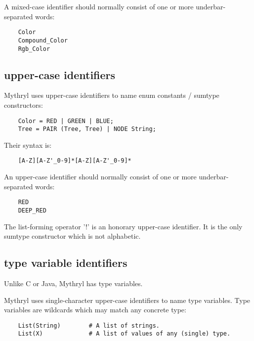 A mixed-case identifier should normally consist of 
one or more underbar-separated words:

\begin{verbatim}
    Color
    Compound_Color
    Rgb_Color
\end{verbatim}

\cutend*

\subsection{upper-case identifiers}
\label{section:ref:identifiers:upper-case}

Mythryl uses upper-case identifiers to name 
enum constants / sumtype constructors:

\begin{verbatim}
    Color = RED | GREEN | BLUE;
    Tree = PAIR (Tree, Tree) | NODE String;
\end{verbatim}

Their syntax is:

\begin{verbatim}
    [A-Z][A-Z'_0-9]*[A-Z][A-Z'_0-9]*
\end{verbatim}

An upper-case identifier should normally consist of 
one or more underbar-separated words:

\begin{verbatim}
    RED
    DEEP_RED
\end{verbatim}

The list-forming operator '!' is an honorary upper-case identifier. 
It is the only sumtype constructor which is not alphabetic.

\cutend*

\subsection{type variable identifiers}
\label{section:ref:identifiers:type-variable}

Unlike C or Java, Mythryl has type variables.

Mythryl uses single-character upper-case identifiers to name 
type variables.  Type variables are wildcards which may 
match any concrete type:

\begin{verbatim}
    List(String)        # A list of strings.
    List(X)             # A list of values of any (single) type.
\end{verbatim}

